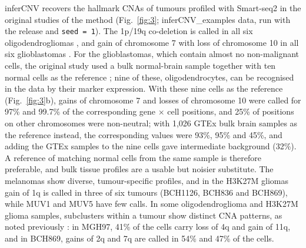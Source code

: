 inferCNV recovers the hallmark CNAs of tumours profiled with Smart-seq2 in the original studies of the method (Fig.~\ref{fig:3}; inferCNV\_examples data, run with the release and \texttt{seed\ =\ 1}). The 1p/19q co-deletion is called in all six oligodendrogliomas \citep{tirosh2016oligo}, and gain of chromosome 7 with loss of chromosome 10 in all six glioblastomas \citep{patel2014}. For the glioblastomas, which contain almost no non-malignant cells, the original study used a bulk normal-brain sample together with ten normal cells as the reference \citep{patel2014}; nine of these, oligodendrocytes, can be recognised in the data by their marker expression. With these nine cells as the reference (Fig.~\ref{fig:3}b), gains of chromosome 7 and losses of chromosome 10 were called for 97\% and 99.7\% of the corresponding gene $\times$ cell positions, and 25\% of positions on other chromosomes were non-neutral; with 1,026 GTEx bulk brain samples as the reference instead, the corresponding values were 93\%, 95\% and 45\%, and adding the GTEx samples to the nine cells gave intermediate background (32\%). A reference of matching normal cells from the same sample is therefore preferable, and bulk tissue profiles are a usable but noisier substitute. The melanomas \citep{tirosh2016melanoma} show diverse, tumour-specific profiles, and in the H3K27M gliomas \citep{filbin2018} gain of 1q is called in three of six tumours (BCH1126, BCH836 and BCH869), while MUV1 and MUV5 have few calls. In some oligodendroglioma and H3K27M glioma samples, subclusters within a tumour show distinct CNA patterns, as noted previously \citep{haas2021thesis}: in MGH97, 41\% of the cells carry loss of 4q and gain of 11q, and in BCH869, gains of 2q and 7q are called in 54\% and 47\% of the cells.


